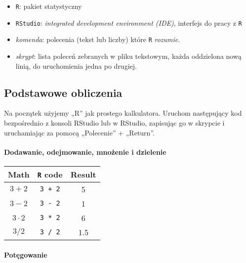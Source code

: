 \documentclass[
]{article}
\providecommand{\tightlist}{%
  \setlength{\itemsep}{0pt}\setlength{\parskip}{0pt}}
\begin{document}
\begin{itemize}
\tightlist
\item
  \texttt{R}: pakiet statystyczny
\item
  \texttt{RStudio}: \emph{integrated development environment (IDE)},
  interfejs do pracy z \texttt{R}
\item
  \emph{komenda}: polecenia (tekst lub liczby) które \texttt{R}
  \emph{rozumie}.
\item
  \emph{skrypt}: lista poleceń zebranych w pliku tekstowym, każda
  oddzielona nową linią, do uruchomienia jedna po drugiej.
\end{itemize}

\hypertarget{podstawowe-obliczenia}{%
\subsection{Podstawowe obliczenia}\label{podstawowe-obliczenia}}

Na początek użyjemy „R'' jak prostego kalkulatora. Uruchom następujący
kod bezpośrednio z konsoli RStudio lub w RStudio, zapisując go w
skrypcie i uruchamiając za pomocą „Polecenie'' + „Return''.

\hypertarget{dodawanie-odejmowanie-mnoux17cenie-i-dzielenie}{%
\paragraph*{Dodawanie, odejmowanie, mnożenie i
dzielenie}\label{dodawanie-odejmowanie-mnoux17cenie-i-dzielenie}}

\begin{longtable}[]{@{}ccc@{}}
\toprule
Math & \texttt{R} code & Result \\
\midrule
\endhead
\(3 + 2\) & \texttt{3\ +\ 2} & 5 \\
\(3 - 2\) & \texttt{3\ -\ 2} & 1 \\
\(3 \cdot2\) & \texttt{3\ *\ 2} & 6 \\
\(3 / 2\) & \texttt{3\ /\ 2} & 1.5 \\
\bottomrule
\end{longtable}

\hypertarget{potux119gowanie}{%
\paragraph*{Potęgowanie}\label{potux119gowanie}}
\end{document}
